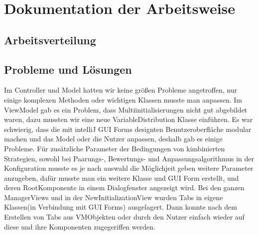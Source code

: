 \section{Dokumentation der Arbeitsweise}


\subsection{Arbeitsverteilung}


\subsection{Probleme und Lösungen}

Im Controller und Model hatten wir keine größen Probleme angetroffen, nur einige komplexen Methoden oder wichtigen Klassen musste man anpassen. Im ViewModel gab es ein Problem, dass Multiinitialisierungen nicht gut abgebildet waren, dazu mussten wir eine neue VariableDistribution Klasse einführen. Es war schwierig, dass die mit intelliJ GUI Forms designten Benutzeroberfläche modular machen und das Model oder die Nutzer anpassen, deshalb gab es einige Probleme. Für zusätzliche Parameter der Bedingungen von kimbinierten Strategien, sowohl bei Paarungs-, Bewertungs- und Anpassungsalgorithmus in der Konfiguration musste es je nach auswahl die Möglichjeit geben weitere Parameter anzugeben, dafür musste man ein weitere Klasse und GUI Form erstellt, und deren RootKomponente in einem Dialogfenster angezeigt wird. Bei den ganzen ManagerViews und in der NewInitializationView wurden Tabs in eigene Klassen(in Verbindung mit GUI Forms) ausgelagert. Dann konnte  nach dem Erstellen von Tabs aus VMObjekten oder durch den Nutzer einfach wieder auf diese und ihre Komponenten zugegeriffen werden.